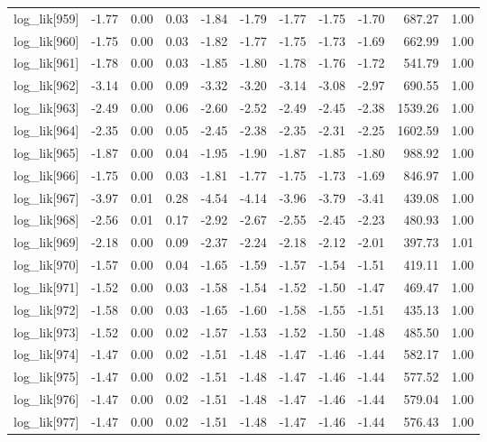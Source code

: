 \begin{table}[ht]
\begin{tabular}{rrrrrrrrrrr}
  log\_lik[959] & -1.77 & 0.00 & 0.03 & -1.84 & -1.79 & -1.77 & -1.75 & -1.70 & 687.27 & 1.00 \\ 
  log\_lik[960] & -1.75 & 0.00 & 0.03 & -1.82 & -1.77 & -1.75 & -1.73 & -1.69 & 662.99 & 1.00 \\ 
  log\_lik[961] & -1.78 & 0.00 & 0.03 & -1.85 & -1.80 & -1.78 & -1.76 & -1.72 & 541.79 & 1.00 \\ 
  log\_lik[962] & -3.14 & 0.00 & 0.09 & -3.32 & -3.20 & -3.14 & -3.08 & -2.97 & 690.55 & 1.00 \\ 
  log\_lik[963] & -2.49 & 0.00 & 0.06 & -2.60 & -2.52 & -2.49 & -2.45 & -2.38 & 1539.26 & 1.00 \\ 
  log\_lik[964] & -2.35 & 0.00 & 0.05 & -2.45 & -2.38 & -2.35 & -2.31 & -2.25 & 1602.59 & 1.00 \\ 
  log\_lik[965] & -1.87 & 0.00 & 0.04 & -1.95 & -1.90 & -1.87 & -1.85 & -1.80 & 988.92 & 1.00 \\ 
  log\_lik[966] & -1.75 & 0.00 & 0.03 & -1.81 & -1.77 & -1.75 & -1.73 & -1.69 & 846.97 & 1.00 \\ 
  log\_lik[967] & -3.97 & 0.01 & 0.28 & -4.54 & -4.14 & -3.96 & -3.79 & -3.41 & 439.08 & 1.00 \\ 
  log\_lik[968] & -2.56 & 0.01 & 0.17 & -2.92 & -2.67 & -2.55 & -2.45 & -2.23 & 480.93 & 1.00 \\ 
  log\_lik[969] & -2.18 & 0.00 & 0.09 & -2.37 & -2.24 & -2.18 & -2.12 & -2.01 & 397.73 & 1.01 \\ 
  log\_lik[970] & -1.57 & 0.00 & 0.04 & -1.65 & -1.59 & -1.57 & -1.54 & -1.51 & 419.11 & 1.00 \\ 
  log\_lik[971] & -1.52 & 0.00 & 0.03 & -1.58 & -1.54 & -1.52 & -1.50 & -1.47 & 469.47 & 1.00 \\ 
  log\_lik[972] & -1.58 & 0.00 & 0.03 & -1.65 & -1.60 & -1.58 & -1.55 & -1.51 & 435.13 & 1.00 \\ 
  log\_lik[973] & -1.52 & 0.00 & 0.02 & -1.57 & -1.53 & -1.52 & -1.50 & -1.48 & 485.50 & 1.00 \\ 
  log\_lik[974] & -1.47 & 0.00 & 0.02 & -1.51 & -1.48 & -1.47 & -1.46 & -1.44 & 582.17 & 1.00 \\ 
  log\_lik[975] & -1.47 & 0.00 & 0.02 & -1.51 & -1.48 & -1.47 & -1.46 & -1.44 & 577.52 & 1.00 \\ 
  log\_lik[976] & -1.47 & 0.00 & 0.02 & -1.51 & -1.48 & -1.47 & -1.46 & -1.44 & 579.04 & 1.00 \\ 
  log\_lik[977] & -1.47 & 0.00 & 0.02 & -1.51 & -1.48 & -1.47 & -1.46 & -1.44 & 576.43 & 1.00 \\ 

\end{tabular}
\end{table}
